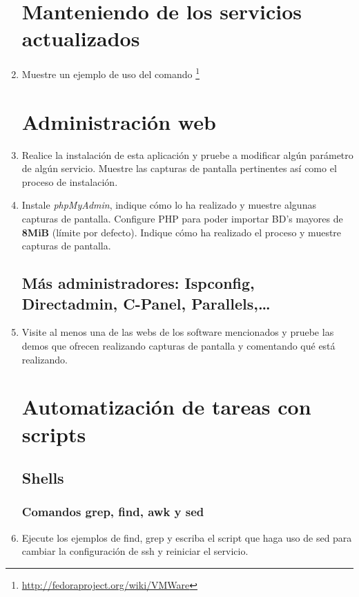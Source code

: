 \documentclass[paper=a4, fontsize=11pt]{scrartcl} %
\numberwithin{equation}{section} %
\numberwithin{figure}{section} %
\numberwithin{table}{section} %
\begin{document}
\begin{enumerate}
	\section{Manteniendo de los servicios actualizados}
		\item Muestre un ejemplo de uso del comando \footnote{\url{http://fedoraproject.org/wiki/VMWare}}
	
	\section{Administración web}
		\item Realice la instalación de esta aplicación y pruebe a modificar algún parámetro de algún
		servicio. Muestre las capturas de pantalla pertinentes así como el proceso de instalación.
		
		\item Instale \textit{phpMyAdmin}, indique cómo lo ha realizado y muestre algunas capturas de
		pantalla. Configure PHP para poder importar BD's mayores de \textbf{8MiB} (límite por defecto).
		Indique cómo ha realizado el proceso y muestre capturas de pantalla.
	
	\subsection{Más administradores: Ispconfig, Directadmin, C-Panel, Parallels,\dots}
		\item Visite al menos una de las webs de los software mencionados y pruebe las demos que
		ofrecen realizando capturas de pantalla y comentando qué está realizando.
	
	\section{Automatización de tareas con scripts}
	\subsection{Shells}
	\subsubsection*{Comandos grep, find, awk y sed}
		\item Ejecute los ejemplos de find, grep y escriba el script que haga uso de sed para cambiar
		la configuración de ssh y reiniciar el servicio.
		

\end{enumerate}
\end{document}
